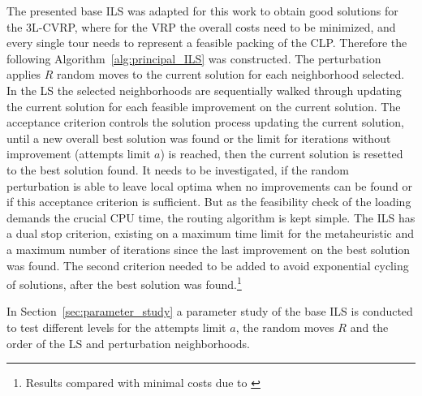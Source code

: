 The presented base \gls{ILS} was adapted for this work to obtain good solutions for the \gls{3L-CVRP}, where for the \gls{VRP}
the overall costs need to be minimized, and every single tour needs to represent a feasible packing of the \gls{CLP}.
Therefore the following Algorithm~\ref{alg:principal_ILS} was constructed. The perturbation applies $R$ random moves
to the current solution for each  neighborhood selected. In the \gls{LS}
the selected neighborhoods are sequentially walked through updating the current solution for each feasible improvement on
the current solution. The acceptance criterion controls the solution process updating the current solution, until a new overall
best solution was found or the limit for iterations without improvement (attempts limit $a$) is reached, then the current solution is resetted
to the best solution found. It needs to be investigated, if the random perturbation is able to leave local optima
when no improvements can be found or if this acceptance criterion is sufficient. But as the feasibility check of the loading
demands the crucial CPU time, the routing algorithm is kept simple. The \gls{ILS} has a dual stop criterion, existing on a maximum time limit for the metaheuristic and a maximum number of
iterations since the last improvement on the best solution was found. The second criterion needed to be added
to avoid exponential cycling of solutions, after the best solution was found.\footnote{Results compared with
    minimal costs due to \cite{tamke_branch-and-cut_2024}}



In Section~\ref{sec:parameter_study} a parameter study of the base \gls{ILS} is conducted to test different
levels for the attempts limit $a$, the random moves $R$ and the order of the \gls{LS} and perturbation neighborhoods.

